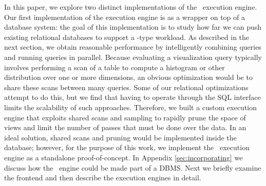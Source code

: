 In this paper, we explore two distinct implementations of the \VizRecDB\ execution
engine. 
Our first implementation of the execution engine is as a wrapper on top of a database
system: the goal of this implementation is to study how far we can 
push existing relational databases to support a \VizRecDB-type workload.
As described in the next section, we obtain reasonable performance by
intelligently combining queries and running queries in parallel. 
Because evaluating a visualization query typically involves 
performing a scan of a table to compute  a histogram or other distribution 
over one or more dimensions, an obvious optimization would be to share 
these scans between many queries.  
Some of our relational optimizations attempt to do this, 
but we find that having to operate through the SQL interface 
limits the scalability of such approaches.  
Therefore, we built a custom execution engine that exploits 
shared scans and sampling to rapidly prune the space of views and 
limit the number of passes that must be done over the data.
In an ideal solution, shared scans and pruning would be implemented inside the
database; however, for the purpose of this work, we implement the \VizRecDB\
execution engine as a standalone proof-of-concept. 
In Appendix \ref{sec:incorporating} we discuss how the \VizRecDB\ engine could
be made part of a DBMS.
Next we briefly examine the \VizRecDB frontend and then describe the execution engines
in detail.


% 


